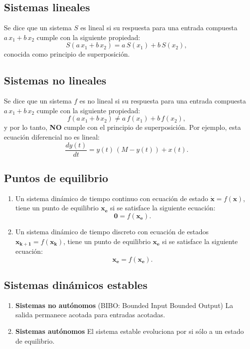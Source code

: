 \documentclass[11pt,a4paper,openany]{book}
\begin{document}
\subsection{Sistemas lineales}
Se dice que un sistema $S$ es lineal si su respuesta para una entrada compuesta $a \, x_{1}+b \, x_{2}$ cumple con la siguiente propiedad:
\begin{equation}
	S(a \, x_{1}+ b\, x_{2}) = a \, S(x_{1}) + b \, S(x_{2}),
\end{equation}
conocida como principio de superposición.

\subsection{Sistemas no lineales}
Se dice que un sistema $f$ es no lineal si su respuesta para una entrada compuesta $a \, x_{1}+b \, x_{2}$ cumple con la siguiente propiedad:
\begin{equation}
	f(a \, x_{1}+b \, x_{2}) \neq a \, f(x_{1}) + b \, f(x_{2}),
\end{equation}
y por lo tanto, \textbf{NO} cumple con el principio de superposición. Por ejemplo, esta ecuación diferencial no es lineal:
\begin{equation}
	\frac{dy(t)}{dt} = y(t) \, (M - y(t)) + x(t).
\end{equation}

\subsection{Puntos de equilibrio}
\begin{enumerate}
	\item Un sistema dinámico de tiempo continuo con ecuación de estado $\mathbf{\dot x} = f(\mathbf{x})$, tiene un punto de equilibrio $\mathbf{x_{e}}$ si se satisface la siguiente ecuación:
	\begin{equation}
		\mathbf{0} = f(\mathbf{x_{e}}).
	\end{equation}
	
	\item Un sistema dinámico de tiempo discreto con ecuación de estados $\mathbf{x_{k+1}} = f(\mathbf{x_{k}})$, tiene un punto de equilibrio $\mathbf{x_{e}}$ si se satisface la siguiente ecuación:
	\begin{equation}
		\mathbf{x_{e}} = f(\mathbf{x_{e}}).
	\end{equation}
\end{enumerate}

\subsection{Sistemas dinámicos estables}
\begin{enumerate}
	\item \textbf{Sistemas no autónomos} (BIBO: Bounded Input Bounded Output) La salida permanece acotada para entradas acotadas.
	\item \textbf{Sistemas autónomos} El sistema estable evoluciona por si sólo a un estado de equilibrio.
\end{enumerate}
	
\end{document}
